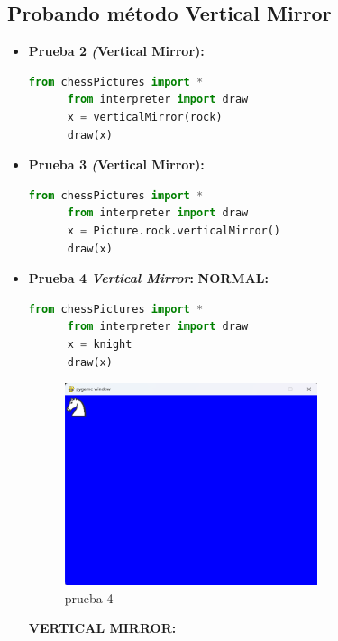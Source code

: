 \documentclass{article}
\begin{document}

  \subsection{Probando método Vertical Mirror}
  \begin{itemize}
    \item \textbf{Prueba 2 \textit(Vertical Mirror):}
    \begin{lstlisting}[language=Python, caption=Código de prueba Python (ERROR)]
      from chessPictures import *
      from interpreter import draw
      x = verticalMirror(rock)
      draw(x)
    \end{lstlisting}
    \item \textbf{Prueba 3 \textit(Vertical Mirror):}
    \begin{lstlisting}[language=Python, caption=Código de prueba Python (ERROR)]
      from chessPictures import *
      from interpreter import draw
      x = Picture.rock.verticalMirror()
      draw(x)
    \end{lstlisting}
    \item \textbf{Prueba 4 \textit{Vertical Mirror}:}
    \textbf{NORMAL:}
    \begin{lstlisting}[language=Python, caption=Código de prueba Python]
      from chessPictures import *
      from interpreter import draw
      x = knight
      draw(x)
    \end{lstlisting}
    \begin{figure}[H]
      \centering
      \includegraphics[width=0.7\textwidth, keepaspectratio]{img/normal.png}
      \caption{prueba 4}
    \end{figure}
    \newpage
    \textbf{VERTICAL MIRROR:}
    \begin{lstlisting}[language=Python, caption=Código de prueba Python]

\end{lstlisting}
\end{itemize}
\end{document}
